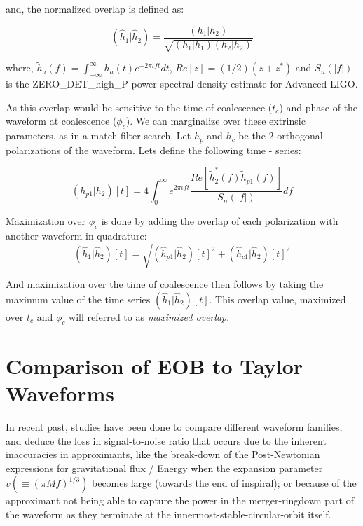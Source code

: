\documentclass[aps,
prd,
amsmath,
amssymb,
twocolumn,
floatfix,
groupedaddress]{revtex4-1}
\def\l({\left(}
\def\r){\right)}
\begin{document}
and, the normalized overlap is defined as:

\begin{equation}
(\hat{h}_1|\hat{h}_2) = \dfrac{(h_1|h_2)}{\sqrt{(h_1|h_1)(h_2|h_2)}}
\end{equation}

where, $\tilde{h}_a(f) = \int^{\infty}_{-\infty}h_a(t)e^{-2\pi\iota f t}dt$, $Re[z] = (1/2)(z+z^*)$ and $S_n(|f|)$ is the ZERO\_DET\_high\_P power spectral density estimate for Advanced LIGO.

As this overlap would be sensitive to the time of coalescence ($t_c$) and phase of the waveform at coalescence ($\phi_c$). We can marginalize over these extrinsic parameters, as in a match-filter search. Let $h_p$ and $h_c$ be the 2 orthogonal polarizations of the waveform. Lets define the following time - series:

\begin{equation}
(h_{p1}|h_{2})[t] = 4\int^{\infty}_0 e^{2\pi \iota f t} \dfrac{Re\left[\tilde{h}_{2}^*(f) \tilde{h}_{p1}(f)\right]}{S_n(|f|)} df
\end{equation}

Maximization over $\phi_c$ is done by adding the overlap of each polarization with another waveform in quadrature:
\begin{equation}
(\hat{h}_1|\hat{h}_2)[t] = \sqrt{(\hat{h}_{p1}|\hat{h}_2)[t]^2 + (\hat{h}_{c1}|\hat{h}_2)[t]^2}
\end{equation}

And maximization over the time of coalescence then follows by taking the maximum value of the time series $(\hat{h}_1|\hat{h}_2)[t]$. This overlap value, maximized over $t_c$ and $\phi_c$ will referred to as \textit{maximized overlap}.


\section{Comparison of EOB to Taylor Waveforms}\label{sec:level1:PNComparisons}

In recent past, studies\citep{CompTemplates2001,CompTemplates2009,DamourF2EOB01,NRPNComparisonBaker2007,NRPNComparisonBoyleetal} have been done to compare different waveform families, and deduce the loss in signal-to-noise ratio that occurs due to the inherent inaccuracies in approximants, like the break-down of the Post-Newtonian expressions for gravitational flux / Energy when the expansion parameter $v\l(\equiv (\pi Mf)^{1/3}\r)$ becomes large (towards the end of inspiral); or because of the approximant not being able to capture the power in the merger-ringdown part of the waveform as they terminate at the innermost-stable-circular-orbit\citep{} itself.
\end{document}
